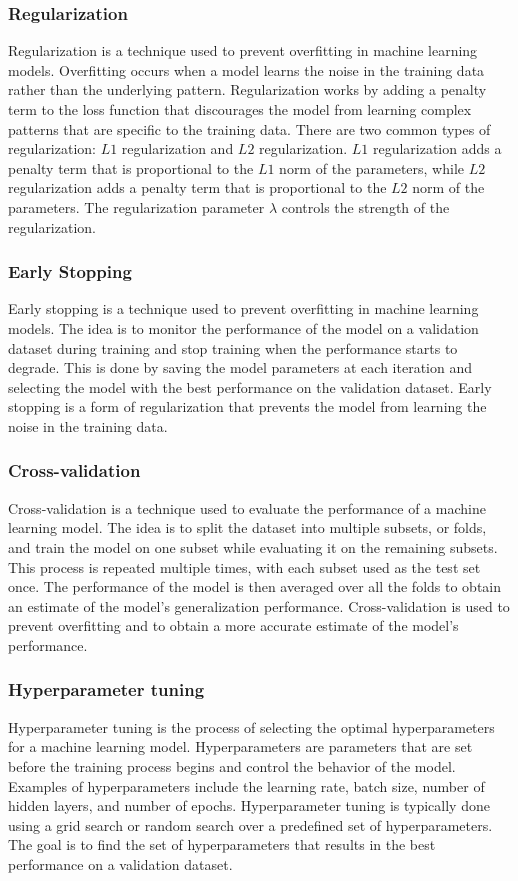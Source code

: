 \documentclass{article}
\begin{document}
\subsubsection{Regularization}
Regularization is a technique used to prevent overfitting in machine learning models. Overfitting occurs when a model learns the noise in the training data rather than the underlying pattern. Regularization works by adding a penalty term to the loss function that discourages the model from learning complex patterns that are specific to the training data. There are two common types of regularization: $L1$ regularization and $L2$ regularization. $L1$ regularization adds a penalty term that is proportional to the $L1$ norm of the parameters, while $L2$ regularization adds a penalty term that is proportional to the $L2$ norm of the parameters. The regularization parameter $\lambda$ controls the strength of the regularization.

\subsubsection{Early Stopping}
Early stopping is a technique used to prevent overfitting in machine learning models. The idea is to monitor the performance of the model on a validation dataset during training and stop training when the performance starts to degrade. This is done by saving the model parameters at each iteration and selecting the model with the best performance on the validation dataset. Early stopping is a form of regularization that prevents the model from learning the noise in the training data.

\subsubsection{Cross-validation}
Cross-validation is a technique used to evaluate the performance of a machine learning model. The idea is to split the dataset into multiple subsets, or folds, and train the model on one subset while evaluating it on the remaining subsets. This process is repeated multiple times, with each subset used as the test set once. The performance of the model is then averaged over all the folds to obtain an estimate of the model's generalization performance. Cross-validation is used to prevent overfitting and to obtain a more accurate estimate of the model's performance.

\subsubsection{Hyperparameter tuning}
Hyperparameter tuning is the process of selecting the optimal hyperparameters for a machine learning model. Hyperparameters are parameters that are set before the training process begins and control the behavior of the model. Examples of hyperparameters include the learning rate, batch size, number of hidden layers, and number of epochs. Hyperparameter tuning is typically done using a grid search or random search over a predefined set of hyperparameters. The goal is to find the set of hyperparameters that results in the best performance on a validation dataset.
\end{document}
